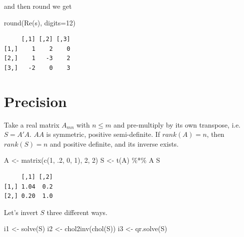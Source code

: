 \documentclass[
  letterpaper,
]{book}
\newenvironment{Shaded}{\begin{snugshade}}{\end{snugshade}}
\newcommand{\AttributeTok}[1]{\textcolor[rgb]{0.40,0.45,0.13}{#1}}
\newcommand{\DecValTok}[1]{\textcolor[rgb]{0.68,0.00,0.00}{#1}}
\newcommand{\FunctionTok}[1]{\textcolor[rgb]{0.28,0.35,0.67}{#1}}
\newcommand{\NormalTok}[1]{\textcolor[rgb]{0.00,0.23,0.31}{#1}}
\newcommand{\OtherTok}[1]{\textcolor[rgb]{0.00,0.23,0.31}{#1}}
\newcommand{\SpecialCharTok}[1]{\textcolor[rgb]{0.37,0.37,0.37}{#1}}
\begin{document}
and then round we get

\begin{Shaded}
\begin{Highlighting}[]
\FunctionTok{round}\NormalTok{(}\FunctionTok{Re}\NormalTok{(s), }\AttributeTok{digits=}\DecValTok{12}\NormalTok{)}
\end{Highlighting}
\end{Shaded}

\begin{verbatim}
     [,1] [,2] [,3]
[1,]    1    2    0
[2,]    1   -3    2
[3,]   -2    0    3
\end{verbatim}

\hypertarget{precision}{%
\section{Precision}\label{precision}}

Take a real matrix \(A_{mn}\) with \(n \le m\) and pre-multiply by its
own transpose, i.e.~\(S = A'A\). \(AA\) is symmetric, positive
semi-definite. If \(rank(A) = n\), then \(rank(S) = n\) and positive
definite, and its inverse exists.

\begin{Shaded}
\begin{Highlighting}[]
\NormalTok{A  }\OtherTok{\textless{}{-}} \FunctionTok{matrix}\NormalTok{(}\FunctionTok{c}\NormalTok{(}\DecValTok{1}\NormalTok{, .}\DecValTok{2}\NormalTok{, }\DecValTok{0}\NormalTok{, }\DecValTok{1}\NormalTok{), }\DecValTok{2}\NormalTok{, }\DecValTok{2}\NormalTok{)}
\NormalTok{S }\OtherTok{\textless{}{-}} \FunctionTok{t}\NormalTok{(A) }\SpecialCharTok{\%*\%}\NormalTok{ A}
\NormalTok{S}
\end{Highlighting}
\end{Shaded}

\begin{verbatim}
     [,1] [,2]
[1,] 1.04  0.2
[2,] 0.20  1.0
\end{verbatim}

Let's invert \(S\) three different ways.

\begin{Shaded}
\begin{Highlighting}[]
\NormalTok{i1 }\OtherTok{\textless{}{-}} \FunctionTok{solve}\NormalTok{(S) }
\NormalTok{i2 }\OtherTok{\textless{}{-}} \FunctionTok{chol2inv}\NormalTok{(}\FunctionTok{chol}\NormalTok{(S))}
\NormalTok{i3 }\OtherTok{\textless{}{-}} \FunctionTok{qr.solve}\NormalTok{(S) }
\end{Highlighting}
\end{Shaded}
\end{document}
